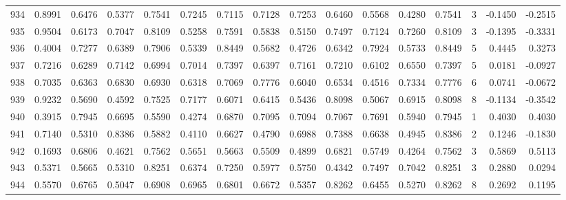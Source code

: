 \begin{tabular}{lrrrrrrrrrrrrrrr}
934 &      0.8991 &  0.6476 &  0.5377 &  0.7541 &  0.7245 &  0.7115 &  0.7128 &  0.7253 &  0.6460 &  0.5568 &   0.4280 &     0.7541 &      3 &                   -0.1450 &                    -0.2515 \\
935 &      0.9504 &  0.6173 &  0.7047 &  0.8109 &  0.5258 &  0.7591 &  0.5838 &  0.5150 &  0.7497 &  0.7124 &   0.7260 &     0.8109 &      3 &                   -0.1395 &                    -0.3331 \\
936 &      0.4004 &  0.7277 &  0.6389 &  0.7906 &  0.5339 &  0.8449 &  0.5682 &  0.4726 &  0.6342 &  0.7924 &   0.5733 &     0.8449 &      5 &                    0.4445 &                     0.3273 \\
937 &      0.7216 &  0.6289 &  0.7142 &  0.6994 &  0.7014 &  0.7397 &  0.6397 &  0.7161 &  0.7210 &  0.6102 &   0.6550 &     0.7397 &      5 &                    0.0181 &                    -0.0927 \\
938 &      0.7035 &  0.6363 &  0.6830 &  0.6930 &  0.6318 &  0.7069 &  0.7776 &  0.6040 &  0.6534 &  0.4516 &   0.7334 &     0.7776 &      6 &                    0.0741 &                    -0.0672 \\
939 &      0.9232 &  0.5690 &  0.4592 &  0.7525 &  0.7177 &  0.6071 &  0.6415 &  0.5436 &  0.8098 &  0.5067 &   0.6915 &     0.8098 &      8 &                   -0.1134 &                    -0.3542 \\
940 &      0.3915 &  0.7945 &  0.6695 &  0.5590 &  0.4274 &  0.6870 &  0.7095 &  0.7094 &  0.7067 &  0.7691 &   0.5940 &     0.7945 &      1 &                    0.4030 &                     0.4030 \\
941 &      0.7140 &  0.5310 &  0.8386 &  0.5882 &  0.4110 &  0.6627 &  0.4790 &  0.6988 &  0.7388 &  0.6638 &   0.4945 &     0.8386 &      2 &                    0.1246 &                    -0.1830 \\
942 &      0.1693 &  0.6806 &  0.4621 &  0.7562 &  0.5651 &  0.5663 &  0.5509 &  0.4899 &  0.6821 &  0.5749 &   0.4264 &     0.7562 &      3 &                    0.5869 &                     0.5113 \\
943 &      0.5371 &  0.5665 &  0.5310 &  0.8251 &  0.6374 &  0.7250 &  0.5977 &  0.5750 &  0.4342 &  0.7497 &   0.7042 &     0.8251 &      3 &                    0.2880 &                     0.0294 \\
944 &      0.5570 &  0.6765 &  0.5047 &  0.6908 &  0.6965 &  0.6801 &  0.6672 &  0.5357 &  0.8262 &  0.6455 &   0.5270 &     0.8262 &      8 &                    0.2692 &                     0.1195 \\

\end{tabular}

